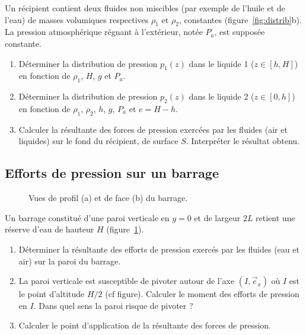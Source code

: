{{Un r\'ecipient contient deux fluides non miscibles (par exemple de l'huile
et de l'eau) de masses volumiques respectives $\rho_1$ et $\rho_2$,
constantes (figure~\ref{fig:distrib}b).
La pression atmosph\'erique r\'egnant \`a l'ext\'erieur, not\'ee $P_a$,
est suppos\'ee constante. 
\begin{enumerate}
\item
D\'eterminer la distribution de pression $p_1(z)$ dans le liquide 1
($z\in[h, H]$) en fonction de $\rho_1$, $H$, $g$ et $P_a$.
\item
D\'eterminer la distribution de pression $p_2(z)$ dans le liquide 2
($z\in[0, h]$)
en fonction de $\rho_1$, $\rho_2$, $h$, $g$, $P_a$ et $e=H-h$.
\item
Calculer la r\'esultante des forces de pression exerc\'ees par les fluides
(air et liquides) sur le fond du r\'ecipient, de surface $S$.
Interpr\'eter le r\'esultat obtenu.
\end{enumerate}


\subsection{Efforts de pression sur un barrage}

\begin{figure}[htb]
\begin{center}
 \qquad 
\end{center}
\caption{Vues de profil (a) et de face (b) du barrage.}
\label{fig:barrage}
\end{figure}

\noindent
Un barrage constitu\'e d'une paroi verticale en $y=0$ et de largeur $2L$
retient une r\'eserve d'eau de hauteur $H$ (figure~\ref{fig:barrage}).
\begin{enumerate}
\item
D\'eterminer la r\'esultante des efforts de pression exerc\'es par les fluides
(eau et air) sur la paroi du barrage.
\item
La paroi verticale est susceptible de pivoter autour de l'axe $(I, \vec{e}_x)$
o\`u $I$ est le point d'altitude $H/2$ (cf figure).
Calculer le moment des efforts de pression en $I$.
Dans quel sens la paroi risque de pivoter ?
\item
Calculer le point d'application de la r\'esultante des forces de pression.
\end{enumerate}



}}
